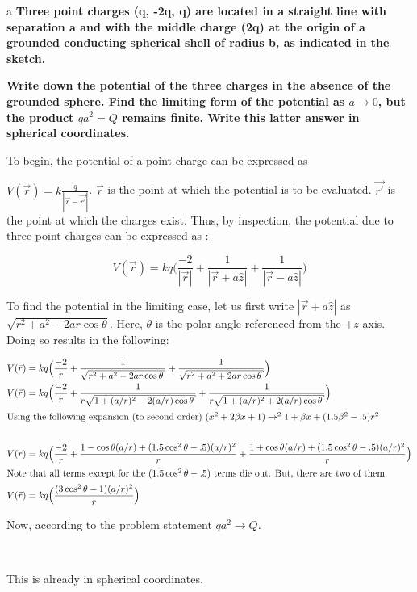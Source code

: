 \begin{homeworkProblem}[Jackson 3rd ed. : 3.7]

\begin{homeworkSection}{a}
\textbf{Three point charges (q, -2q, q) are located in a straight line with separation a and 
with the middle charge (2q) at the origin of a grounded conducting spherical shell 
of radius b, as indicated in the sketch. }
\\ \par
\textbf{Write down the potential of the three charges in the absence of the grounded 
sphere. Find the limiting form of the potential as $a\rightarrow 0$, but the product 
$qa^2 = Q$ remains finite. Write this latter answer in spherical coordinates. }
\\ \par
To begin, the potential of a point charge can be expressed as  $V(\vec{r}) = k\frac{q}{|\vec{r}-\vec{r'}|}$. $\vec{r}$ is the point at which the potential is to be evaluated. $\vec{r'}$ is the point at which the charges exist. Thus, by inspection, the potential due to three point charges can be expressed as :

\[
V(\vec{r})=kq \Big(\frac{-2}{|\vec{r}|} + \frac{1}{|\vec{r} + a\hat{z}|} + \frac{1}{|\vec{r} - a\hat{z}|} \Big)
\]

To find the potential in the limiting case, let us first write $|\vec{r} + a\hat{z}|$ as $\sqrt{r^2+a^2-2ar\cos\theta}$. Here, $\theta$ is the polar angle referenced from the $+z$ axis. Doing so results in the following:

\begin{center}
\begin{align}
V(\vec{r})&=kq \Big(\frac{-2}{r} + \frac{1}{\sqrt{r^2+a^2-2ar\cos\theta}} + \frac{1}{\sqrt{r^2+a^2+2ar\cos\theta}} \Big) \nonumber \\
V(\vec{r})&=kq \Big(\frac{-2}{r} + \frac{1}{r\sqrt{1+(a/r)^2-2(a/r)\cos\theta}} + \frac{1}{r\sqrt{1+(a/r)^2+2(a/r)\cos\theta}} \Big) \nonumber \\
\intertext{Using the following expansion (to second order) $(x^2+2\beta x +1) \rightarrow^2 1+\beta x + (1.5\beta^2-.5)r^2$} \nonumber \\
V(\vec{r})&=kq \Big(\frac{-2}{r} + \frac{1-\cos\theta (a/r) + (1.5\cos^2\theta -.5)(a/r)^2}{r} + \frac{1+\cos\theta(a/r)+(1.5\cos^2\theta-.5)(a/r)^2}{r}\Big) \nonumber \\
\intertext{Note that all terms except for the $(1.5\cos^2\theta - .5)$ terms die out. But, there are two of them.} \nonumber
V(\vec{r})&=kq \Big(\frac{(3\cos^2\theta -1)(a/r)^2}{r} \Big) \nonumber 
\end{align}
\end{center}
Now, according to the problem statement $qa^2 \rightarrow Q$. \\ \par
\problemAnswer{\[V(\vec{r}) =kQ \frac{3\cos^2\theta-1}{r^3}\]}
\\ \par
This is already in spherical coordinates.


\end{homeworkSection}
\end{homeworkProblem}
